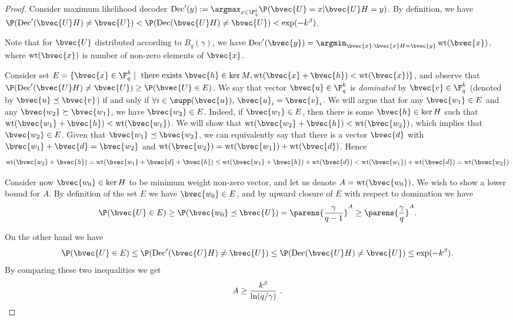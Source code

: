 \documentclass[11pt]{article}
\newcommand{\Dec}{\mathrm{Dec}}
\newcommand{\dom}{\preceq}
\newcommand{\wt}{\mathop\mathrm{wt}}
\begin{document}
\begin{proof}
	Consider maximum likelihood decoder $\Dec'(y) := \argmax_{x \in \F_q^k} \P(\bvec{U} = x | \bvec{U}H = y)$. By definition, we have $\P(\Dec'(\bvec{U}H) \not= \bvec{U}) < \P(\Dec(\bvec{U}H) \not= \bvec{U}) < \exp(-k^{\beta})$.
	
	Note that for $\bvec{U}$ distributed according to $B_{q}(\gamma)$, we have $\Dec'(\bvec{y}) = \argmin_{\bvec{x} : \bvec{x}H = \bvec{y}} \wt(\bvec{x})$, where $\wt(\bvec{x})$ is number of non-zero elements of $\bvec{x}$.
	
	Consider set $E = \{\bvec{x} \in \F_q^k \mid \text{ there exists } \bvec{h}\in \ker M, \wt(\bvec{x}+\bvec{h}) < \wt(\bvec{x})\}$, and observe that $\P(\Dec'(\bvec{U}H) \not = \bvec{U}) \geq \P(\bvec{U} \in E)$. We say that vector $\bvec{u} \in \F_q^k$ is \emph{dominated} by $\bvec{v} \in \F_q^k$ (denoted by $\bvec{u} \dom \bvec{v}$) if and only if $\forall i \in \supp(\bvec{u}),\, \bvec{u}_i = \bvec{v}_i$. We will argue that for any $\bvec{w_1} \in E$ and any $\bvec{w_2} \succeq \bvec{w_1}$, we have $\bvec{w_2} \in E$. Indeed, if $\bvec{w_1} \in E$, then there is some $\bvec{h} \in \ker H$ such that $\wt(\bvec{w_1} + \bvec{h}) < \wt(\bvec{w_1})$. We will show that $\wt(\bvec{w_2} + \bvec{h}) < \wt(\bvec{w_2})$, which implies that $\bvec{w_2} \in E$. Given that $\bvec{w_1} \preceq \bvec{w_2}$, we can equivalently say that there is a vector $\bvec{d}$ with $\bvec{w_1} + \bvec{d} = \bvec{w_2}$ and $\wt(\bvec{w_2}) = \wt(\bvec{w_1}) + \wt(\bvec{d})$. Hence
	\begin{equation*}
		\wt(\bvec{w_2} + \bvec{h}) = \wt(\bvec{w_1} + \bvec{d} + \bvec{h}) \leq \wt(\bvec{w_1} + \bvec{h}) + \wt(\bvec{d}) < \wt(\bvec{w_1}) + \wt(\bvec{d}) = \wt(\bvec{w_2})
	\end{equation*}
	
	Consider now $\bvec{w_0} \in \ker H$ to be minimum weight non-zero vector, and let us denote $A = \wt(\bvec{w_0})$. We wish to show a lower bound for $A$. By definition of the set $E$ we have $\bvec{w_0} \in E$, and by upward closure of $E$ with respect to domination we have 
	\[\P(\bvec{U} \in E) \geq \P(\bvec{w_0} \preceq \bvec{U}) = \parens{\frac{\gamma}{q - 1}}^A\ge \parens{\frac \gamma{q}}^A.\]
	
	On the other hand we have 
	\[\P(\bvec{U} \in E) \leq \P(\Dec'(\bvec{U}H) \not= \bvec{U}) \leq \P(\Dec(\bvec{U}H) \not= \bvec{U}) \leq \exp(-k^{\beta}).\]
	By comparing these two inequalities we get
	\begin{equation*}
		A \geq \frac{k^\beta}{\ln (q/\gamma)} \ . \qedhere
	\end{equation*}
\end{proof}
\end{document}
